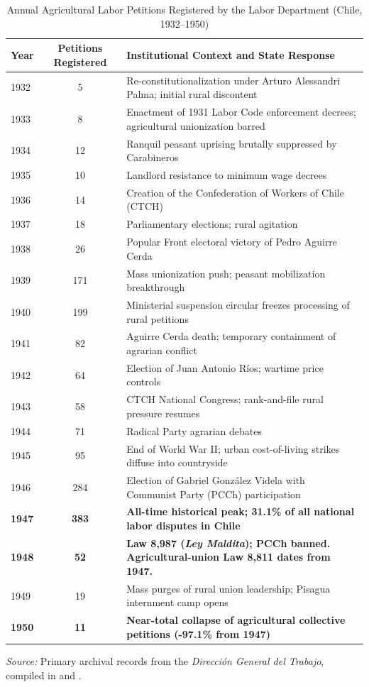 \begin{table}[htbp]
\centering
\footnotesize
\caption{Annual Agricultural Labor Petitions Registered by the Labor Department (Chile, 1932--1950)}
\label{tab:app_petitions_full}
\begin{tabular}{lcp{9.5cm}}
\toprule
\textbf{Year} & \textbf{Petitions Registered} & \textbf{Institutional Context and State Response} \\
\midrule
1932 & 5 & Re-constitutionalization under Arturo Alessandri Palma; initial rural discontent \\
1933 & 8 & Enactment of 1931 Labor Code enforcement decrees; agricultural unionization barred \\
1934 & 12 & Ranquil peasant uprising brutally suppressed by Carabineros \\
1935 & 10 & Landlord resistance to minimum wage decrees \\
1936 & 14 & Creation of the Confederation of Workers of Chile (CTCH) \\
1937 & 18 & Parliamentary elections; rural agitation \\
1938 & 26 & Popular Front electoral victory of Pedro Aguirre Cerda \\
1939 & 171 & Mass unionization push; peasant mobilization breakthrough \\
1940 & 199 & Ministerial suspension circular freezes processing of rural petitions \\
1941 & 82 & Aguirre Cerda death; temporary containment of agrarian conflict \\
1942 & 64 & Election of Juan Antonio Ríos; wartime price controls \\
1943 & 58 & CTCH National Congress; rank-and-file rural pressure resumes \\
1944 & 71 & Radical Party agrarian debates \\
1945 & 95 & End of World War II; urban cost-of-living strikes diffuse into countryside \\
1946 & 284 & Election of Gabriel González Videla with Communist Party (PCCh) participation \\
\textbf{1947} & \textbf{383} & \textbf{All-time historical peak; 31.1\% of all national labor disputes in Chile} \\
\textbf{1948} & \textbf{52} & \textbf{Law 8,987 (\textit{Ley Maldita}); PCCh banned. Agricultural-union Law 8,811 dates from 1947.} \\
1949 & 19 & Mass purges of rural union leadership; Pisagua internment camp opens \\
\textbf{1950} & \textbf{11} & \textbf{Near-total collapse of agricultural collective petitions (-97.1\% from 1947)} \\
\bottomrule
\end{tabular}
\begin{minipage}{\textwidth}
\vspace{0.3em}
\footnotesize
\textit{Source:} Primary archival records from the \textit{Dirección General del Trabajo}, compiled in \citet{MorrisOyaneder1962} and \citet{Loveman1971,Loveman1976}.
\end{minipage}
\end{table}

